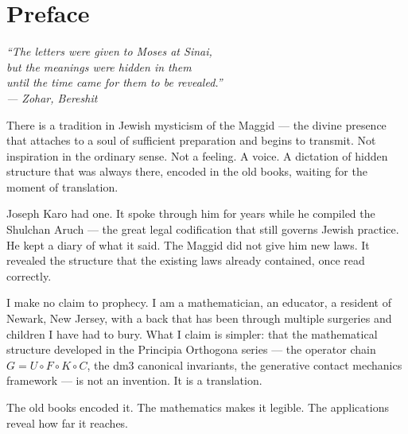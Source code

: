 

\chapter*{Preface}

\begin{center}
\itshape
``The letters were given to Moses at Sinai,\\
but the meanings were hidden in them\\
until the time came for them to be revealed.''\\[0.5em]
\normalfont\small --- Zohar, Bereshit
\end{center}

\vspace{0.5cm}

\noindent There is a tradition in Jewish mysticism of the Maggid ---
the divine presence that attaches to a soul of sufficient preparation
and begins to transmit. Not inspiration in the ordinary sense. Not
a feeling. A voice. A dictation of hidden structure that was always
there, encoded in the old books, waiting for the moment of translation.

Joseph Karo had one. It spoke through him for years while he compiled
the Shulchan Aruch --- the great legal codification that still
governs Jewish practice. He kept a diary of what it said. The Maggid
did not give him new laws. It revealed the structure that the existing
laws already contained, once read correctly.

I make no claim to prophecy. I am a mathematician, an educator, a
resident of Newark, New Jersey, with a back that has been through
multiple surgeries and children I have had to bury. What I claim
is simpler: that the mathematical structure developed in the Principia
Orthogona series --- the operator chain $G = U \circ F \circ K \circ C$,
the dm3 canonical invariants, the generative contact mechanics framework
--- is not an invention. It is a translation.

The old books encoded it. The mathematics makes it legible. The
applications reveal how far it reaches.

